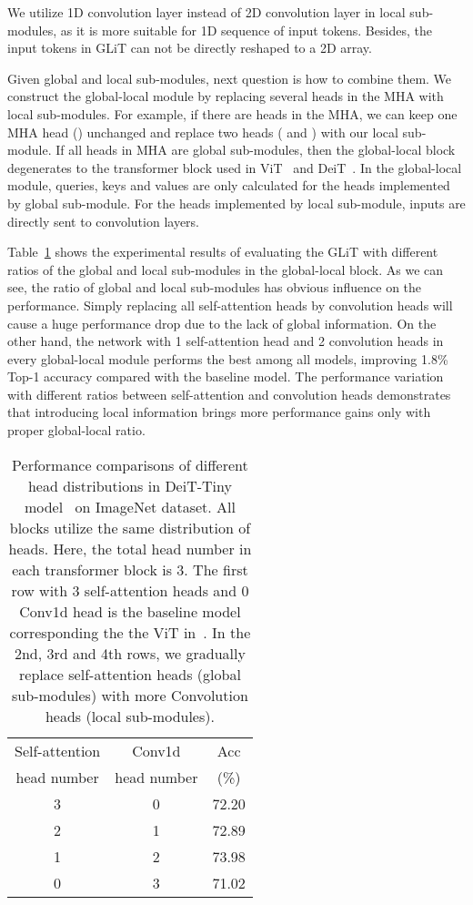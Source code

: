 \documentclass[10pt,twocolumn,letterpaper]{article}
\begin{document}
We utilize 1D convolution layer instead of 2D convolution layer in local sub-modules, as it is more suitable for 1D sequence of input tokens. Besides, the  input tokens in GLiT can not be directly reshaped to a 2D array.

{}
Given global and local sub-modules, next question is how to combine them.
We construct the global-local module by replacing several heads in the MHA with local sub-modules. For example, if there are  heads in the MHA, we can keep one MHA head () unchanged and replace two heads ( and ) with our local sub-module.
If all heads in MHA are global sub-modules, then the global-local block degenerates to the transformer block used in ViT~\cite{vit_trans} and DeiT~\cite{deit}. In the global-local module, queries, keys and values are only calculated for the heads implemented by global sub-module. For the heads implemented by local sub-module, inputs are directly sent to convolution layers. 

Table~\ref{tab:conv} shows the experimental results of evaluating the GLiT with different ratios of the global and local sub-modules in the global-local block. 
As we can see, the ratio of global and local sub-modules has obvious influence on the performance. Simply replacing all self-attention heads by convolution heads will cause a huge performance drop due to the lack of global information. 
On the other hand, the network with 1 self-attention head and 2 convolution heads in every global-local module performs the best among all models, improving 1.8\% Top-1 accuracy compared with the baseline model. The performance variation with different ratios between self-attention and convolution heads demonstrates that introducing local information brings more performance gains only with proper global-local ratio.

\begin{table}[H]
	\centering
	\caption{Performance comparisons of different head distributions in DeiT-Tiny model~\cite{deit} on ImageNet dataset. All blocks utilize the same distribution of heads. Here, the total head number in each transformer block is 3. The first row with 3 self-attention heads and 0 Conv1d head is the baseline model corresponding the the ViT in~\cite{vit_trans}. In the 2nd, 3rd and 4th rows, we gradually replace  self-attention heads  (global sub-modules) with more Convolution heads (local sub-modules).}
	\centering
	\begin{tabular}{c|c|c}
		\hline
		Self-attention &  {Conv1d } & {Acc}   \\
		head number &  {head number} & {(\%)}   \\
		\hline
		3 & 0 & 72.20    \\
		\hline
		2  & 1& 72.89   \\
		\hline
		1 & 2 & 73.98    \\
		\hline
		0  & 3 & 71.02  \\
		\hline
	\end{tabular}
	\label{tab:conv} 
	\vspace{-12pt}
\end{table}
\end{document}
